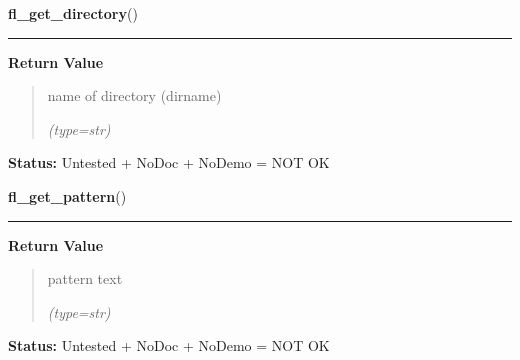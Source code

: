     \label{xformslib:flgoodies:fl_get_directory}

    \vspace{0.5ex}

\hspace{.8\funcindent}\begin{boxedminipage}{\funcwidth}

    \raggedright \textbf{fl\_get\_directory}()

    \vspace{-1.5ex}

    \rule{\textwidth}{0.5\fboxrule}
\setlength{\parskip}{2ex}
\setlength{\parskip}{1ex}
      \textbf{Return Value}
    \vspace{-1ex}

      \begin{quote}
      name of directory (dirname)

      {\it (type=str)}

      \end{quote}

\textbf{Status:} Untested + NoDoc + NoDemo = NOT OK



    \end{boxedminipage}

    \label{xformslib:flgoodies:fl_get_pattern}

    \vspace{0.5ex}

\hspace{.8\funcindent}\begin{boxedminipage}{\funcwidth}

    \raggedright \textbf{fl\_get\_pattern}()

    \vspace{-1.5ex}

    \rule{\textwidth}{0.5\fboxrule}
\setlength{\parskip}{2ex}
\setlength{\parskip}{1ex}
      \textbf{Return Value}
    \vspace{-1ex}

      \begin{quote}
      pattern text

      {\it (type=str)}

      \end{quote}

\textbf{Status:} Untested + NoDoc + NoDemo = NOT OK



    \end{boxedminipage}

